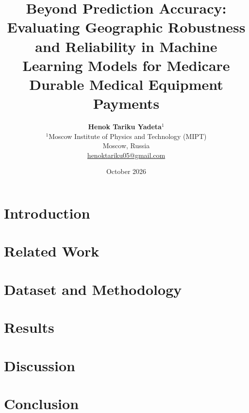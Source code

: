 \documentclass[11pt,a4paper]{article}
\title{
Beyond Prediction Accuracy:
Evaluating Geographic Robustness and Reliability
in Machine Learning Models for Medicare
Durable Medical Equipment Payments
}
\author{
\textbf{Henok Tariku Yadeta}$^{1}$\\[4pt]
\normalsize $^{1}$Moscow Institute of Physics
and Technology (MIPT)\\
\normalsize Moscow, Russia\\[3pt]
\small
\href{mailto:henoktariku05@gmail.com}
{henoktariku05@gmail.com}
}
\date{October 2026}
\begin{document}
\maketitle

\begin{abstract}

\end{abstract}

\section{Introduction}
\label{sec:introduction}


\section{Related Work}
\label{sec:related}


\section{Dataset and Methodology}
\label{sec:methods}


\section{Results}
\label{sec:results}


\FloatBarrier

\section{Discussion}
\label{sec:discussion}


\section{Conclusion}
\label{sec:conclusion}





\end{document}
